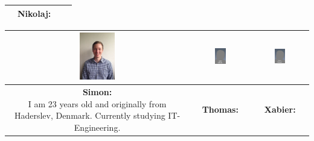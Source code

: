 \begin{table}[h]
\begin{tabular}{|c|c|c|c|}
{} 

&

\parbox[t] {0.2\textwidth}{
\textbf{Nikolaj:} \\

} 

\\\hline
\end{tabular}

\begin{tabular}{|c|c|c|}
\hline
\includegraphics[width=0.2\textwidth]{graphics/Simon_profile} & %
\includegraphics[width=0.2\textwidth]{graphics/AnonProfile} & %
\includegraphics[width=0.2\textwidth]{graphics/AnonProfile} \\ \hline %
\parbox[t] {0.2\textwidth}{
\textbf{Simon:} \\
I am 23 years old and originally from Haderslev, Denmark. Currently studying IT-Engineering.

} 

&

\parbox[t] {0.2\textwidth}{
\textbf{Thomas:} \\

} 

&

\parbox[t] {0.2\textwidth}{
\textbf{Xabier:} \\

} 

\\\hline
\end{tabular}
\end{table}




